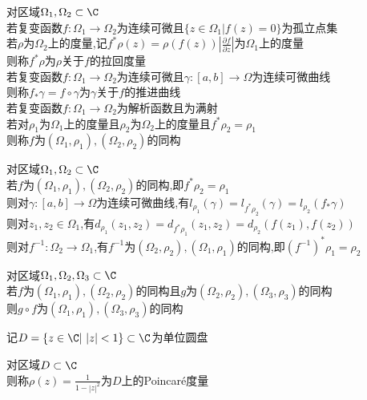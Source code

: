 \begin{dingyi}
对区域$\Omega_1,\Omega_2\subset\C$\\
若复变函数$f:\Omega_1\to\Omega_2$为连续可微且$\{z\in\Omega_1|f(z)=0\}$为孤立点集\\
若$\rho$为$\Omega_2$上的度量,记$f^*\rho(z)=\rho(f(z))|\frac{\partial f}{\partial z}|$为$\Omega_1$上的度量\\
则称$f^*\rho$为$\rho$关于$f$的拉回度量\\
若复变函数$f:\Omega_1\to\Omega_2$为连续可微且$\gamma:[a,b]\to\Omega$为连续可微曲线\\
则称$f_*\gamma=f\circ\gamma$为$\gamma$关于$f$的推进曲线\\
若复变函数$f:\Omega_1\to\Omega_2$为解析函数且为满射\\
若对$\rho_1$为$\Omega_1$上的度量且$\rho_2$为$\Omega_2$上的度量且$f^*\rho_2=\rho_1$\\
则称$f$为$(\Omega_1,\rho_1),(\Omega_2,\rho_2)$的同构
\end{dingyi}

\begin{dingli}
对区域$\Omega_1,\Omega_2\subset\C$\\
若$f$为$(\Omega_1,\rho_1),(\Omega_2,\rho_2)$的同构,即$f^*\rho_2=\rho_1$\\
则对$\gamma:[a,b]\to\Omega$为连续可微曲线,有$l_{\rho_1}(\gamma)=l_{f^*\rho_2}(\gamma)=l_{\rho_2}(f_*\gamma)$\\
则对$z_1,z_2\in\Omega_1$,有$d_{\rho_1}(z_1,z_2)=d_{f^*\rho_1}(z_1,z_2)=d_{\rho_2}(f(z_1),f(z_2))$\\
则对$f^{-1}:\Omega_2\to\Omega_1$,有$f^{-1}$为$(\Omega_2,\rho_2),(\Omega_1,\rho_1)$的同构,即$(f^{-1})^*\rho_1=\rho_2$
\end{dingli}

\begin{dingli}
对区域$\Omega_1,\Omega_2,\Omega_3\subset\C$\\
若$f$为$(\Omega_1,\rho_1),(\Omega_2,\rho_2)$的同构且$g$为$(\Omega_2,\rho_2),(\Omega_3,\rho_3)$的同构\\
则$g\circ f$为$(\Omega_1,\rho_1),(\Omega_3,\rho_3)$的同构
\end{dingli}

\noindent 记$D=\{z\in\C|\ |z|<1\}\subset\C$为单位圆盘

\begin{dingyi}
对区域$D\subset\C$\\
则称$\rho(z)=\frac{1}{1-|z|^2}$为$D$上的Poincaré度量
\end{dingyi}


